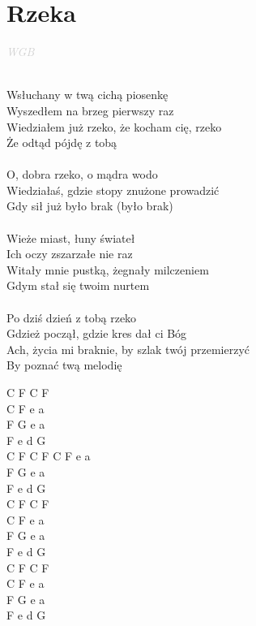 \documentclass[a5paper, 10pt]{book}
\begin{document}
\newpage
\section{Rzeka}\textcolor{lightgray}{\textit{WGB}}\\~\\
\begin{minipage}[t]{0.75\textwidth}
Wsłuchany w twą cichą piosenkę\\
Wyszedłem na brzeg pierwszy raz\\
Wiedziałem już rzeko, że kocham cię, rzeko\\
Że odtąd pójdę z tobą\\
\\
\hspace*{5mm}O, dobra rzeko, o mądra wodo\\
\hspace*{5mm}Wiedziałaś, gdzie stopy znużone prowadzić\\
\hspace*{5mm}Gdy sił już było brak (było brak)\\
\\
Wieże miast, łuny świateł\\
Ich oczy zszarzałe nie raz\\
Witały mnie pustką, żegnały milczeniem\\
Gdym stał się twoim nurtem\\
\\
Po dziś dzień z tobą rzeko\\
Gdzież począł, gdzie kres dał ci Bóg\\
Ach, życia mi braknie, by szlak twój przemierzyć\\
By poznać twą melodię\\
\end{minipage}
\begin{minipage}[t]{0.25\textwidth}
C F C F\\
C F e a\\
F G e a \\
F e d G\\

C F C F C F e a \\
F G e a \\
F e d G \\

C F C F\\
C F e a\\
F G e a \\
F e d G\\

C F C F\\
C F e a\\
F G e a \\
F e d G\\
\end{minipage}
\end{document}
